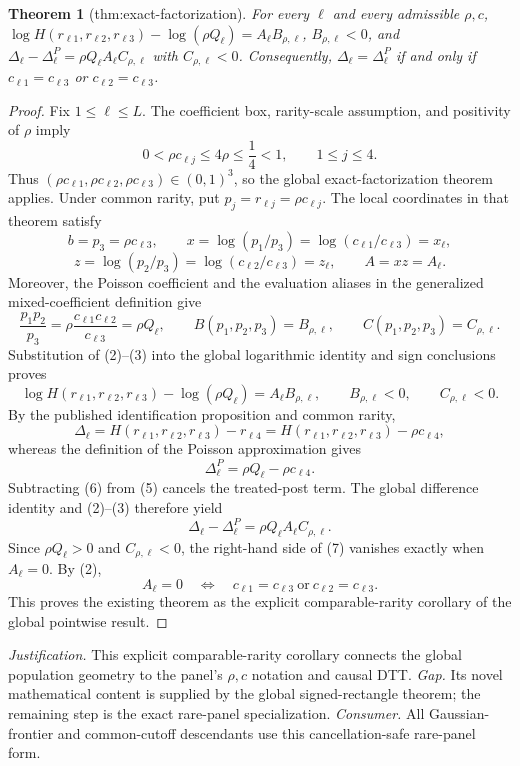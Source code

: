 \documentclass{article}
\newtheorem{theorem}{Theorem}
\begin{document}
\begin{theorem}[thm:exact-factorization]\label{thm:exact-factorization}
For every \(\ell\) and every admissible \(\rho,c\), \(\log H(r_{\ell1},r_{\ell2},r_{\ell3})-\log(\rho Q_{\ell})=A_{\ell}B_{\rho,\ell}\), \(B_{\rho,\ell}<0\), and \(\Delta_{\ell}-\Delta^P_{\ell}=\rho Q_{\ell}A_{\ell}C_{\rho,\ell}\) with \(C_{\rho,\ell}<0\). Consequently, \(\Delta_{\ell}=\Delta^P_{\ell}\) if and only if \(c_{\ell1}=c_{\ell3}\) or \(c_{\ell2}=c_{\ell3}\).
\end{theorem}
\begin{proof}
Fix \(1\le\ell\le L\).  The coefficient box, rarity-scale assumption, and positivity of \(\rho\) imply
\[
0<\rho c_{\ell j}\le4\rho\le\frac14<1,
\qquad 1\le j\le4.
\tag{1}
\]
Thus \((\rho c_{\ell1},\rho c_{\ell2},\rho c_{\ell3})\in(0,1)^3\), so the global exact-factorization theorem applies.  Under common rarity, put \(p_j=r_{\ell j}=\rho c_{\ell j}\).  The local coordinates in that theorem satisfy
\[
b=p_3=\rho c_{\ell3},
\qquad
x=\log(p_1/p_3)=\log(c_{\ell1}/c_{\ell3})=x_\ell,
\]
\[
z=\log(p_2/p_3)=\log(c_{\ell2}/c_{\ell3})=z_\ell,
\qquad
A=xz=A_\ell.
\tag{2}
\]
Moreover, the Poisson coefficient and the evaluation aliases in the generalized mixed-coefficient definition give
\[
\frac{p_1p_2}{p_3}=\rho\frac{c_{\ell1}c_{\ell2}}{c_{\ell3}}=\rho Q_\ell,
\qquad
B(p_1,p_2,p_3)=B_{\rho,\ell},
\qquad
C(p_1,p_2,p_3)=C_{\rho,\ell}.
\tag{3}
\]
Substitution of (2)--(3) into the global logarithmic identity and sign conclusions proves
\[
\log H(r_{\ell1},r_{\ell2},r_{\ell3})-\log(\rho Q_\ell)
=A_\ell B_{\rho,\ell},
\qquad
B_{\rho,\ell}<0,
\qquad C_{\rho,\ell}<0.
\tag{4}
\]
By the published identification proposition and common rarity,
\[
\Delta_\ell
=H(r_{\ell1},r_{\ell2},r_{\ell3})-r_{\ell4}
=H(r_{\ell1},r_{\ell2},r_{\ell3})-\rho c_{\ell4},
\tag{5}
\]
whereas the definition of the Poisson approximation gives
\[
\Delta^P_\ell=\rho Q_\ell-\rho c_{\ell4}.
\tag{6}
\]
Subtracting (6) from (5) cancels the treated-post term.  The global difference identity and (2)--(3) therefore yield
\[
\Delta_\ell-\Delta^P_\ell
=\rho Q_\ell A_\ell C_{\rho,\ell}.
\tag{7}
\]
Since \(\rho Q_\ell>0\) and \(C_{\rho,\ell}<0\), the right-hand side of (7) vanishes exactly when \(A_\ell=0\).  By (2),
\[
A_\ell=0
\quad\Longleftrightarrow\quad
c_{\ell1}=c_{\ell3}\ \text{or}\ c_{\ell2}=c_{\ell3}.
\]
This proves the existing theorem as the explicit comparable-rarity corollary of the global pointwise result.
\end{proof}
\par\smallskip\noindent \textit{Justification.} This explicit comparable-rarity corollary connects the global population geometry to the panel's \(\rho,c\) notation and causal DTT. \textit{Gap.} Its novel mathematical content is supplied by the global signed-rectangle theorem; the remaining step is the exact rare-panel specialization. \textit{Consumer.} All Gaussian-frontier and common-cutoff descendants use this cancellation-safe rare-panel form.
\end{document}
